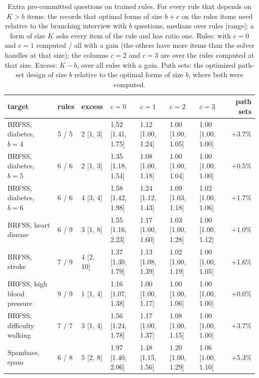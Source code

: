\begin{table}[h]
\centering
\caption{Extra pre-committed questions on trained rules. For every rule that depends on $K>b$ items: the records that optimal forms of size $b+c$ on the rule\textquotesingle s items need relative to the branching interview with $b$ questions, medians over rules [range]; a form of size $K$ asks every item of the rule and has ratio one. Rules: with $c=0$ and $c=1$ computed / all with a gain (the others have more items than the solver handles at that size); the columns $c=2$ and $c=3$ are over the rules computed at that size. Excess: $K-b$, over all rules with a gain. Path sets: the optimized path-set design of size $b$ relative to the optimal forms of size $b$, where both were computed.}
\label{tab:capcurve}
\scriptsize
\setlength{\tabcolsep}{3.5pt}
\begin{tabular}{lllllllr}
\toprule
target & rules & excess & $c=0$ & $c=1$ & $c=2$ & $c=3$ & path sets \\
\midrule
BRFSS, diabetes, $b=4$ & 5 / 5 & 2 [1, 3] & 1.52 [1.41, 1.75] & 1.12 [1.00, 1.24] & 1.00 [1.00, 1.05] & 1.00 [1.00, 1.00] & +3.7\% \\
BRFSS, diabetes, $b=5$ & 6 / 6 & 2 [1, 3] & 1.35 [1.18, 1.54] & 1.08 [1.00, 1.18] & 1.00 [1.00, 1.04] & 1.00 [1.00, 1.00] & +0.5\% \\
BRFSS, diabetes, $b=6$ & 6 / 6 & 4 [3, 4] & 1.58 [1.42, 1.98] & 1.24 [1.12, 1.43] & 1.09 [1.03, 1.18] & 1.02 [1.00, 1.06] & +1.7\% \\
BRFSS, heart disease & 6 / 9 & 3 [1, 8] & 1.55 [1.16, 2.23] & 1.17 [1.00, 1.60] & 1.03 [1.00, 1.28] & 1.00 [1.00, 1.12] & +1.0\% \\
BRFSS, stroke & 7 / 9 & 4 [2, 10] & 1.37 [1.30, 1.79] & 1.13 [1.08, 1.39] & 1.02 [1.00, 1.19] & 1.00 [1.00, 1.05] & +1.6\% \\
BRFSS, high blood pressure & 9 / 9 & 1 [1, 4] & 1.16 [1.07, 1.38] & 1.00 [1.00, 1.17] & 1.00 [1.00, 1.06] & 1.00 [1.00, 1.00] & +0.0\% \\
BRFSS, difficulty walking & 7 / 7 & 3 [1, 4] & 1.56 [1.24, 1.78] & 1.17 [1.00, 1.37] & 1.08 [1.00, 1.15] & 1.00 [1.00, 1.00] & +3.7\% \\
Spambase, spam & 6 / 8 & 5 [2, 8] & 1.97 [1.40, 2.06] & 1.48 [1.15, 1.56] & 1.20 [1.00, 1.29] & 1.06 [1.00, 1.10] & +5.3\% \\
\bottomrule
\end{tabular}
\end{table}
